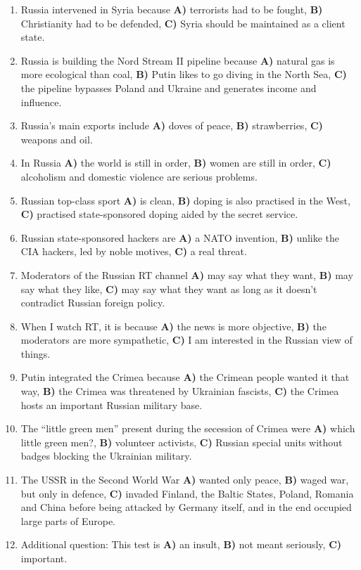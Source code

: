 \begin{enumerate}
\def\labelenumi{\arabic{enumi}.}
\tightlist
\item
  Russia intervened in Syria because \textbf{\textbf{A)}} terrorists had
  to be fought, \textbf{\textbf{B)}} Christianity had to be defended,
  \textbf{\textbf{C)}} Syria should be maintained as a client state.
\item
  Russia is building the Nord Stream II pipeline because \textbf{A)}
  natural gas is more ecological than coal, \textbf{B)} Putin likes to
  go diving in the North Sea, \textbf{C)} the pipeline bypasses Poland
  and Ukraine and generates income and influence.
\item
  Russia's main exports include \textbf{A)} doves of peace, \textbf{B)}
  strawberries, \textbf{C)} weapons and oil.
\item
  In Russia \textbf{A)} the world is still in order, \textbf{B)} women
  are still in order, \textbf{C)} alcoholism and domestic violence are
  serious problems.
\item
  Russian top-class sport \textbf{A)} is clean, \textbf{B)} doping is
  also practised in the West, \textbf{C)} practised state-sponsored
  doping aided by the secret service.
\item
  Russian state-sponsored hackers are \textbf{A)} a NATO invention,
  \textbf{B)} unlike the CIA hackers, led by noble motives, \textbf{C)}
  a real threat.
\item
  Moderators of the Russian RT channel \textbf{A)} may say what they
  want, \textbf{B)} may say what they like, \textbf{C)} may say what
  they want as long as it doesn't contradict Russian foreign policy.
\item
  When I watch RT, it is because \textbf{A)} the news is more objective,
  \textbf{B)} the moderators are more sympathetic, \textbf{C)} I am
  interested in the Russian view of things.
\item
  Putin integrated the Crimea because \textbf{A)} the Crimean people
  wanted it that way, \textbf{B)} the Crimea was threatened by Ukrainian
  fascists, \textbf{C)} the Crimea hosts an important Russian military
  base.
\item
  The ``little green men'' present during the secession of Crimea were
  \textbf{A)} which little green men?, \textbf{B)} volunteer activists,
  \textbf{C)} Russian special units without badges blocking the
  Ukrainian military.
\item
  The USSR in the Second World War \textbf{A)} wanted only peace,
  \textbf{B)} waged war, but only in defence, \textbf{C)} invaded
  Finland, the Baltic States, Poland, Romania and China before being
  attacked by Germany itself, and in the end occupied large parts of
  Europe.
\item
  Additional question: This test is \textbf{A)} an insult, \textbf{B)}
  not meant seriously, \textbf{C)} important.
\end{enumerate}

